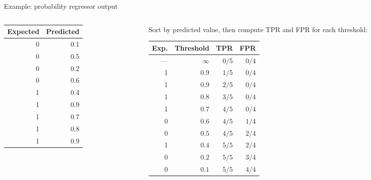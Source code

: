 \begin{frame}{Example: probability regressor output}
  \begin{columns}[T]
    \begin{column}{0.35\textwidth}
      \centering\small
      \begin{tabular}{rr}
        \toprule
        Expected & Predicted \\
        \midrule
        0 & 0.1 \\
        0 & 0.5 \\
        0 & 0.2 \\
        0 & 0.6 \\
        1 & 0.4 \\
        1 & 0.9 \\
        1 & 0.7 \\
        1 & 0.8 \\
        1 & 0.9 \\
        \bottomrule
      \end{tabular}
    \end{column}
    \begin{column}{0.6\textwidth}
      \centering\small
      Sort by predicted value, then compute TPR and FPR for each threshold:

      \vspace{0.2cm}
      \begin{tabular}{rrrr}
        \toprule
        Exp. & Threshold & TPR & FPR \\
        \midrule
        ---  & $\infty$ & $0/5$ & $0/4$ \\
        1 & $0.9$  & $1/5$ & $0/4$ \\
        1 & $0.9$  & $2/5$ & $0/4$ \\
        1 & $0.8$  & $3/5$ & $0/4$ \\
        1 & $0.7$  & $4/5$ & $0/4$ \\
        0 & $0.6$  & $4/5$ & $1/4$ \\
        0 & $0.5$  & $4/5$ & $2/4$ \\
        1 & $0.4$  & $5/5$ & $2/4$ \\
        0 & $0.2$  & $5/5$ & $3/4$ \\
        0 & $0.1$  & $5/5$ & $4/4$ \\
        \bottomrule
      \end{tabular}
    \end{column}
  \end{columns}
\end{frame}

